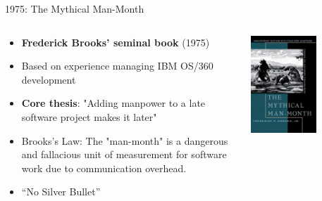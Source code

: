 \documentclass{beamer}
\begin{document}
\begin{frame}[t]{1975: The Mythical Man-Month}
\begin{columns}
    \begin{column}{0.6\textwidth}
        \begin{itemize}
            \item \textbf{Frederick Brooks' seminal book} (1975)
            \item Based on experience managing IBM OS/360 development
            \item \textbf{Core thesis}: "Adding manpower to a late software project makes it later"
            \item \alert{Brooks's Law}: The "man-month" is a dangerous and fallacious unit of measurement for software work due to communication overhead.
            \item ``No Silver Bullet''
        \end{itemize}
    \end{column}
    \begin{column}{0.4\textwidth}
        \includegraphics[width=0.6\textwidth]{images/Mythical Man-Month.jpg}
    \end{column}
\end{columns}
\end{frame}
\end{document}

